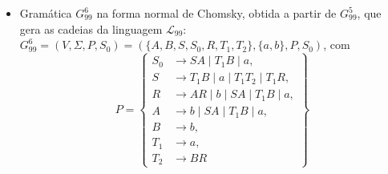 \documentclass[12pt]{article}
\def\myling{{99}} %
\begin{document}
\begin{tcolorbox}[breakable,rounded corners, colback=yellow!5, colframe=red!40!black, title={Forma normal de Chomsky.}]
\begin{itemize}
  \item Gramática $G_{\myling}^6$ na forma normal de Chomsky, obtida a partir de $G_{\myling}^5$, que gera as cadeias da linguagem $\mathcal{L}_{\myling}$:\\
  $G_{\myling}^6=(V,\Sigma,P,S_0)=(\{A,B,S,S_0,R,T_1,T_2\},\{a,b\},P,S_0)$, com
    \[P=\left\{
     \begin{aligned}
      S_0 & \to SA\mid T_1B\mid a, \\
      S   & \to T_1B\mid a\mid T_1T_2\mid T_1R, \\
      R   & \to AR\mid b\mid SA\mid T_1B\mid a, \\
      A   & \to b\mid SA\mid T_1B\mid a, \\
      B   & \to b,\\
      T_1 & \to a,\\
      T_2 & \to BR
     \end{aligned}
    \right\}\]
\end{itemize}
\end{tcolorbox}
\end{document}
